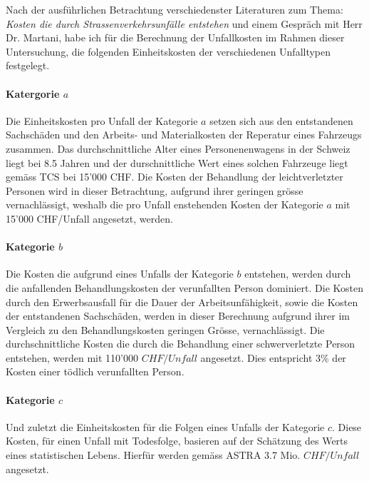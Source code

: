 


Nach der ausführlichen Betrachtung verschiedenster Literaturen zum Thema: \textit{Kosten die durch Strassenverkehrsunfälle entstehen} und einem Gespräch mit Herr Dr. Martani, habe ich für die Berechnung der Unfallkosten im Rahmen dieser Untersuchung, die folgenden Einheitskosten der verschiedenen Unfalltypen festgelegt.

\paragraph{Katergorie $a$} Die Einheitskosten pro Unfall der Kategorie $a$ setzen sich aus den entstandenen Sachschäden und den Arbeits- und Materialkosten der Reperatur eines Fahrzeugs zusammen. Das durchschnittliche Alter eines Personenenwagens in der Schweiz liegt bei 8.5 Jahren und der durschnittliche Wert eines solchen Fahrzeuge liegt gemäss TCS bei 15'000 CHF. Die Kosten der Behandlung der leichtverletzter Personen wird in dieser Betrachtung, aufgrund ihrer geringen grösse vernachlässigt, weshalb die pro Unfall enstehenden Kosten der Kategorie $a$ mit 15'000 CHF/Unfall angesetzt, werden.

\paragraph{Kategorie $b$} Die Kosten die aufgrund eines Unfalls der Kategorie $b$ entstehen, werden durch die anfallenden Behandlungskosten der verunfallten Person dominiert. Die Kosten durch den Erwerbsausfall für die Dauer der Arbeitsunfähigkeit, sowie die Kosten der entstandenen Sachschäden, werden in dieser Berechnung aufgrund ihrer im Vergleich zu den Behandlungskosten geringen Grösse, vernachlässigt. Die durchschnittliche Kosten die durch die Behandlung einer schwerverletzte Person entstehen, werden mit 110'000 $CHF/Unfall$ angesetzt. Dies entspricht 3\% der Kosten einer tödlich verunfallten Person.

\paragraph{Kategorie $c$} Und zuletzt die Einheitskosten für die Folgen eines Unfalls der Kategorie $c$. Diese Kosten, für einen Unfall mit Todesfolge, basieren auf der Schätzung des Werts eines statistischen Lebens. Hierfür werden gemäss ASTRA 3.7 Mio. $CHF/Unfall$ angesetzt.



\newpage




%

